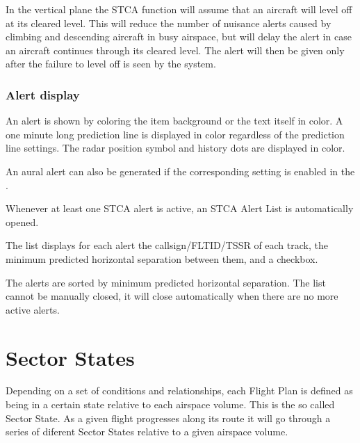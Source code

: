 \documentclass[a4paper,oneside,11pt]{memoir}
\begin{document}
\bigskip

In the vertical plane the STCA function will assume that an aircraft will level off at its cleared level. This will reduce the number of nuisance alerts caused by climbing and descending aircraft in busy airspace, but will delay the alert in case an aircraft continues through its cleared level. The alert will then be given only after the failure to level off is seen by the system.

\subsubsection*{Alert display}

An alert is shown by coloring the  item background or the text itself in  color. A one minute long prediction line is displayed in  color regardless of the prediction line settings. The radar position symbol and history dots are displayed in  color.

\bigskip

An aural alert can also be generated if the corresponding setting is enabled in the .

\bigskip

Whenever at least one STCA alert is active, an STCA Alert List is automatically opened.


The list displays for each alert the callsign/FLTID/TSSR of each track, the minimum predicted horizontal separation between them, and a checkbox.

\bigskip

The alerts are sorted by minimum predicted horizontal separation. The list cannot be manually closed, it will close automatically when there are no more active alerts.

\section{Sector States}

Depending on a set of conditions and relationships, each Flight Plan is defined as being in a certain state relative to each airspace volume. This is the so called Sector State. As a given flight progresses along its route it will go through a series of diferent Sector States relative to a given airspace volume. 

\bigskip
\end{document}

